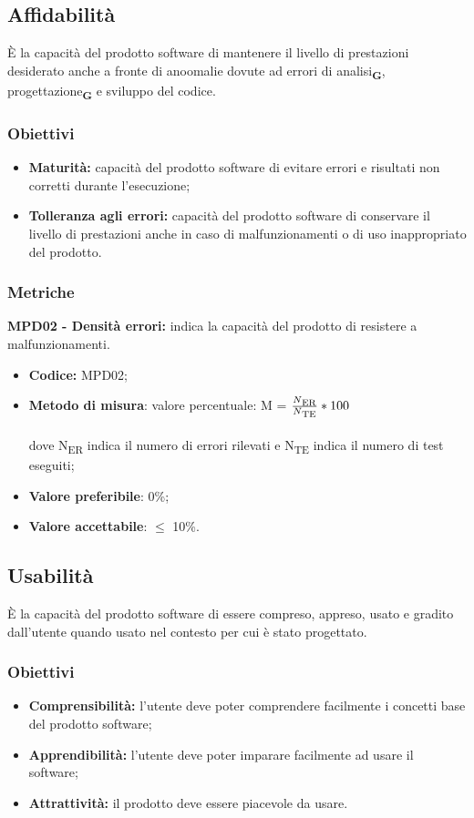 \subsection{Affidabilità}
È la capacità del prodotto software di mantenere il livello di prestazioni
desiderato anche a fronte di anoomalie dovute ad errori di analisi\textsubscript{\textbf{G}}, progettazione\textsubscript{\textbf{G}} e sviluppo del codice.
\subsubsection{Obiettivi}
\begin{itemize}
    \item \textbf{Maturità:} capacità del prodotto software di evitare errori e risultati non corretti durante l’esecuzione;
    \item \textbf{Tolleranza agli errori:} capacità del prodotto software di conservare il livello di prestazioni 
    anche in caso di malfunzionamenti o di uso inappropriato del prodotto.
\end{itemize}
\subsubsection{Metriche}
\textbf{MPD02 - Densità errori:} indica la capacità del prodotto di resistere a malfunzionamenti.
\begin{itemize}
    \item \textbf{Codice:} MPD02;
    \item \textbf{Metodo di misura}: valore percentuale: M = $\frac{N\textsubscript{ER}}{N\textsubscript{TE}}*100$ \\
    \\dove N\textsubscript{ER} indica il numero di errori rilevati e N\textsubscript{TE} indica il numero di test eseguiti;
    \item \textbf{Valore preferibile}: 0\%;
    \item \textbf{Valore accettabile}: $\leq$ 10\%.
\end{itemize}
\subsection{Usabilità}
È la capacità del prodotto software di essere compreso, appreso, usato e gradito dall’utente quando usato nel contesto per cui è stato progettato.
\subsubsection{Obiettivi}
\begin{itemize}
    \item \textbf{Comprensibilità:} l'utente deve poter comprendere facilmente i concetti base del prodotto software;
    \item \textbf{Apprendibilità:} l'utente deve poter imparare facilmente ad usare il software;
    \item \textbf{Attrattività:} il prodotto deve essere piacevole da usare.
\end{itemize}
